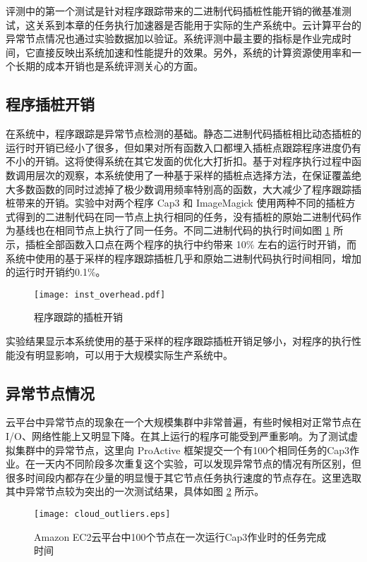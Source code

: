评测中的第一个测试是针对程序跟踪带来的二进制代码插桩性能开销的微基准测试，这关系到本章的任务执行加速器是否能用于实际的生产系统中。云计算平台的异常节点情况也通过实验数据加以验证。系统评测中最主要的指标是作业完成时间，它直接反映出系统加速和性能提升的效果。另外，系统的计算资源使用率和一个长期的成本开销也是系统评测关心的方面。

\subsection{程序插桩开销}
\label{sec:no2_overhead}
在系统中，程序跟踪是异常节点检测的基础。静态二进制代码插桩相比动态插桩的运行时开销已经小了很多，但如果对所有函数入口都埋入插桩点跟踪程序进度仍有不小的开销。这将使得系统在其它发面的优化大打折扣。基于对程序执行过程中函数调用层次的观察，本系统使用了一种基于采样的插桩点选择方法，在保证覆盖绝大多数函数的同时过滤掉了极少数调用频率特别高的函数，大大减少了程序跟踪插桩带来的开销。实验中对两个程序 Cap3 和 ImageMagick 使用两种不同的插桩方式得到的二进制代码在同一节点上执行相同的任务，没有插桩的原始二进制代码作为基线也在相同节点上执行了同一任务。不同二进制代码的执行时间如图 \ref{figure:inst_overhead} 所示，插桩全部函数入口点在两个程序的执行中约带来 10\% 左右的运行时开销，而系统中使用的基于采样的程序跟踪插桩几乎和原始二进制代码执行时间相同，增加的运行时开销约0.1\%。

\begin{figure}
  \centering
  \texttt{[image: inst\_overhead.pdf]}
  \caption{程序跟踪的插桩开销}
  \label{figure:inst_overhead}
\end{figure}

实验结果显示本系统使用的基于采样的程序跟踪插桩开销足够小，对程序的执行性能没有明显影响，可以用于大规模实际生产系统中。

\subsection{异常节点情况}
\label{sec:no2_overhead}
云平台中异常节点的现象在一个大规模集群中非常普遍，有些时候相对正常节点在I/O、网络性能上又明显下降。在其上运行的程序可能受到严重影响。为了测试虚拟集群中的异常节点，这里向 ProActive 框架提交一个有100个相同任务的Cap3作业。在一天内不同阶段多次重复这个实验，可以发现异常节点的情况有所区别，但很多时间段内都存在少量的明显慢于其它节点任务执行速度的节点存在。这里选取其中异常节点较为突出的一次测试结果，具体如图 \ref{figure:outlier_cloud} 所示。
\begin{figure}
  \centering
  \texttt{[image: cloud\_outliers.eps]}
  \caption{Amazon EC2云平台中100个节点在一次运行Cap3作业时的任务完成时间}
  \label{figure:outlier_cloud}
\end{figure}

